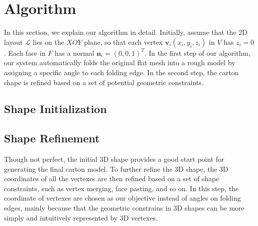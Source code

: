\section{Algorithm}\label{sec:optimization}


In this section, we explain our algorithm in detail. 
Initially, assume that the 2D layout $\mathcal{L}$ lies on the $XOY$ plane, so that each vertex $\mathbf{v}_i(x_i,y_i,z_i)$ in $V$ has $z_i=0$. 
Each face in $F$ has a normal $\mathbf{n}_i=(0,0,1)^T$.
%
In the first step of our algorithm, our system automatically folds the original flat mesh into a rough model by assigning a specific angle to each folding edge.
In the second step, the carton shape is refined based on a set of potential geometric constraints.

\subsection{Shape Initialization}\label{sec:initialization}


\subsection{Shape Refinement}\label{sec:refinement}

Though not perfect, the initial 3D shape provides a good start point for generating the final carton model. 
%
To further refine the 3D shape, the 3D coordinates of all the vertexes are then refined based on a set of shape constraints, such as vertex merging, face pasting, and so on.
%
In this step, the coordinate of vertexes are chosen as our objective instead of angles on folding edges, mainly because that the geometric constrains in 3D shapes can be more simply and intuitively represented by 3D vertexes.


